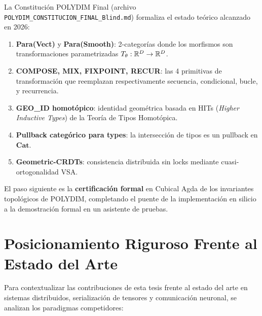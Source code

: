 La Constitución POLYDIM Final (archivo \texttt{POLYDIM\_CONSTITUCION\_FINAL\_Blind.md})
formaliza el estado teórico alcanzado en 2026:

\begin{enumerate}
\item \textbf{Para(Vect)} y \textbf{Para(Smooth)}: 2-categorías donde los morfismos
son transformaciones parametrizadas $T_\theta: \mathbb{R}^D \to \mathbb{R}^D$.

\item \textbf{COMPOSE, MIX, FIXPOINT, RECUR}: las 4 primitivas de transformación que
reemplazan respectivamente secuencia, condicional, bucle, y recurrencia.

\item \textbf{GEO\_ID homotópico}: identidad geométrica basada en HITs
(\textit{Higher Inductive Types}) de la Teoría de Tipos Homotópica.

\item \textbf{Pullback categórico para types}: la intersección de tipos es un pullback en $\mathbf{Cat}$.

\item \textbf{Geometric-CRDTs}: consistencia distribuida sin locks mediante cuasi-ortogonalidad VSA.
\end{enumerate}

El paso siguiente es la \textbf{certificación formal} en Cubical Agda de los
invariantes topológicos de POLYDIM, completando el puente de la implementación
en silicio a la demostración formal en un asistente de pruebas.

\section{Posicionamiento Riguroso Frente al Estado del Arte}
\label{sec:related_work}

Para contextualizar las contribuciones de esta tesis frente al estado del arte en sistemas distribuidos, 
serialización de tensores y comunicación neuronal, se analizan los paradigmas competidores:


